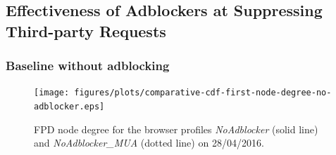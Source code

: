 \documentclass[compsoc, conference, letterpaper, 10pt, times]{IEEEtran}
\begin{document}




\subsection{Effectiveness of Adblockers at Suppressing Third-party Requests}
\subsubsection{Baseline without adblocking}

  \begin{figure}
 \centering

 \texttt{[image: figures/plots/comparative-cdf-first-node-degree-no-adblocker.eps]}

 \caption{FPD node degree for the browser profiles \textit{NoAdblocker} (solid line) and \textit{NoAdblocker\_MUA} (dotted line) on 28/04/2016.}
 \label{fig:first_node_degree}
\end{figure}
\end{document}
